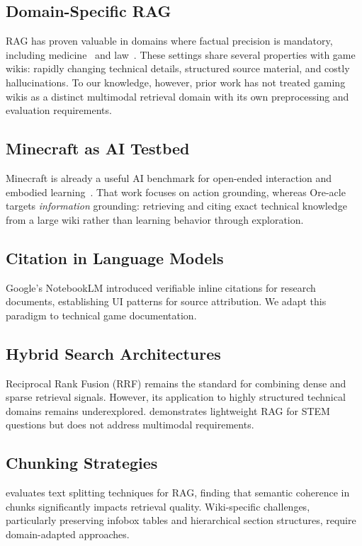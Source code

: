 \documentclass[11pt,a4paper]{article}
\begin{document}
\subsection{Domain-Specific RAG}
RAG has proven valuable in domains where factual precision is mandatory, including medicine~\cite{singhal2023medpalm,nentidis2023bioasq} and law~\cite{guha2023legalbench,wu2023bloomberggpt}. These settings share several properties with game wikis: rapidly changing technical details, structured source material, and costly hallucinations. To our knowledge, however, prior work has not treated gaming wikis as a distinct multimodal retrieval domain with its own preprocessing and evaluation requirements.

\subsection{Minecraft as AI Testbed}
Minecraft is already a useful AI benchmark for open-ended interaction and embodied learning~\cite{fan2022minedojo,wang2023voyager,cai2023groot}. That work focuses on action grounding, whereas Ore-acle targets \textit{information} grounding: retrieving and citing exact technical knowledge from a large wiki rather than learning behavior through exploration.

\subsection{Citation in Language Models}
Google's NotebookLM \cite{notebooklm2023} introduced verifiable inline citations for research documents, establishing UI patterns for source attribution. We adapt this paradigm to technical game documentation.

\subsection{Hybrid Search Architectures}
Reciprocal Rank Fusion (RRF) \cite{cormack2009reciprocal} remains the standard for combining dense and sparse retrieval signals. However, its application to highly structured technical domains remains underexplored. \citet{kumar2025wikipedia} demonstrates lightweight RAG for STEM questions but does not address multimodal requirements.

\subsection{Chunking Strategies}
\citet{kshirsagar2024enhancing} evaluates text splitting techniques for RAG, finding that semantic coherence in chunks significantly impacts retrieval quality. Wiki-specific challenges, particularly preserving infobox tables and hierarchical section structures, require domain-adapted approaches.
\end{document}
